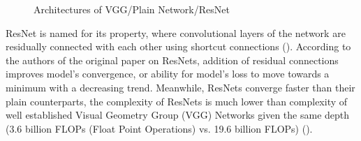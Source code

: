 \documentclass{article}
\begin{document}
\begin{figure}
	\begin{center}
	\end{center}
	\caption{Architectures of VGG/Plain Network/ResNet}
\end{figure}

ResNet is named for its property, where convolutional layers of the network
are residually connected with each other using shortcut connections
(). According to the authors of the original paper on ResNets,
addition of residual connections improves model's convergence, or ability for
model's loss to move towards a minimum with a decreasing trend. Meanwhile,
ResNets converge faster than their plain counterparts, the complexity of 
ResNets is much lower than complexity of well established Visual Geometry
Group (VGG) Networks given the same depth (3.6 billion FLOPs (Float Point 
Operations) vs. 19.6 billion FLOPs) ().


\newpage


\end{document}
